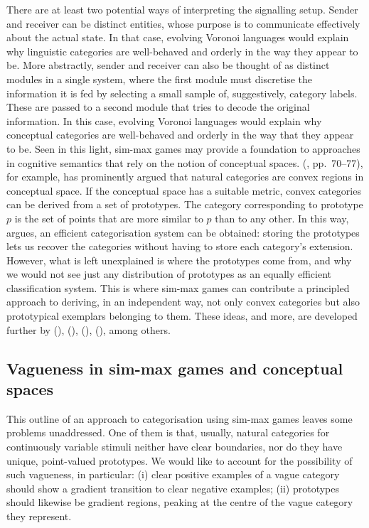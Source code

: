 \documentclass[11pt,english]{article}
\numberwithin{equation}{section}
\newcommand{\citetbjps}[1]{\citeauthor{#1} (\citeyear{#1})}
\newcommand{\citetbjpspost}[2]{\citeauthor{#2} (\citeyear{#2}, #1)}
\begin{document}
There are at least two potential ways of interpreting the signalling setup.  Sender and
receiver can be distinct entities, whose purpose is to communicate effectively about the actual
state. In that case, evolving Voronoi languages would explain why linguistic categories are
well-behaved and orderly in the way they appear to be. More abstractly, sender and receiver can
also be thought of as distinct modules in a single system, where the first module must
discretise the information it is fed by selecting a small sample of, suggestively, category
labels. These are passed to a second module that tries to decode the original information. In
this case, evolving Voronoi languages would explain why conceptual categories are well-behaved
and orderly in the way that they appear to be.  Seen in this light, sim-max games may provide a
foundation to approaches in cognitive semantics that rely on the notion of conceptual spaces.
\citetbjpspost{pp.~70--77}{Gardenfors2000:Conceptual-Spac}, for example, has prominently argued
that natural categories are convex regions in conceptual space. If the conceptual space has a
suitable metric, convex categories can be derived from a set of prototypes. The category
corresponding to prototype $p$ is the set of points that are more similar to $p$ than to any
other. In this way, \citeauthor{Gardenfors2000:Conceptual-Spac} argues, an efficient
categorisation system can be obtained: storing the prototypes lets us recover the categories
without having to store each category's extension. However, what is left unexplained is where
the prototypes come from, and why we would not see just any distribution of prototypes as an
equally efficient classification system. This is where sim-max games can contribute a
principled approach to deriving, in an independent way, not only convex categories but also
prototypical exemplars belonging to them.  These ideas, and more, are developed further by
\citetbjps{Jager2007:The-Evolution-o}, \citetbjps{JagerRooijvan-Rooij2007:Language-Struct}, \citetbjps{JagerMetzger2011:Voronoi-Languag}, \citetbjps{OConnor2014-OCOEPC}, among
others.

\subsection{Vagueness in sim-max games and conceptual spaces}
\label{sec:vagueness-in-sim-max-games}

This outline of an approach to categorisation using sim-max games
leaves some problems unaddressed. One of them is that, usually, natural
categories for continuously variable stimuli neither have
clear boundaries, nor do they have unique, point-valued prototypes. We
would like to account for the possibility of such vagueness, in
particular: (i) clear positive examples of a vague category should
show a gradient transition to clear negative examples;
(ii) prototypes should likewise be gradient regions, peaking at the
centre of the vague category they represent.
\end{document}
